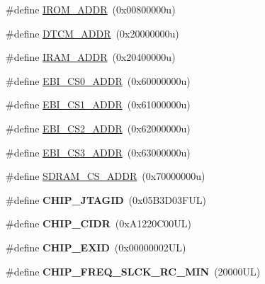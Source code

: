 \begin{DoxyCompactItemize}
\item 
\#define \mbox{\hyperlink{group__SAMV71Q20__definitions_ga694212ffb8c2786bacee3d0ad6020bda}{I\+R\+O\+M\+\_\+\+A\+D\+DR}}~(0x00800000u)
\item 
\#define \mbox{\hyperlink{group__SAMV71Q20__definitions_ga26626a425f7ebb3a0c2dbc276f0d9f78}{D\+T\+C\+M\+\_\+\+A\+D\+DR}}~(0x20000000u)
\item 
\#define \mbox{\hyperlink{group__SAMV71Q20__definitions_gaae45ac2ef16942159481c767ac4805cf}{I\+R\+A\+M\+\_\+\+A\+D\+DR}}~(0x20400000u)
\item 
\#define \mbox{\hyperlink{group__SAMV71Q20__definitions_ga9bcbb97ddae3b2cc5e2c9613d33f66b4}{E\+B\+I\+\_\+\+C\+S0\+\_\+\+A\+D\+DR}}~(0x60000000u)
\item 
\#define \mbox{\hyperlink{group__SAMV71Q20__definitions_gaaddd9fdbbc77c9aced5308819f502a26}{E\+B\+I\+\_\+\+C\+S1\+\_\+\+A\+D\+DR}}~(0x61000000u)
\item 
\#define \mbox{\hyperlink{group__SAMV71Q20__definitions_ga058a35f9991487dc2dd12ada792d0730}{E\+B\+I\+\_\+\+C\+S2\+\_\+\+A\+D\+DR}}~(0x62000000u)
\item 
\#define \mbox{\hyperlink{group__SAMV71Q20__definitions_gad66ebdd0fc33ec3cf85dbaa14bbf05d9}{E\+B\+I\+\_\+\+C\+S3\+\_\+\+A\+D\+DR}}~(0x63000000u)
\item 
\#define \mbox{\hyperlink{group__SAMV71Q20__definitions_ga61b7db25daf759c2a2beb6e5a0b57a84}{S\+D\+R\+A\+M\+\_\+\+C\+S\+\_\+\+A\+D\+DR}}~(0x70000000u)
\item 
\mbox{\label{group__SAMV71Q20__definitions_gaa614519778eec0df55d3eeab3223e3f6}} 
\#define {\bfseries C\+H\+I\+P\+\_\+\+J\+T\+A\+G\+ID}~(0x05\+B3\+D03\+F\+U\+L)
\item 
\mbox{\label{group__SAMV71Q20__definitions_ga1e1ae44dd9269a8a98c1d7e7a60e9fbd}} 
\#define {\bfseries C\+H\+I\+P\+\_\+\+C\+I\+DR}~(0x\+A1220\+C00\+U\+L)
\item 
\mbox{\label{group__SAMV71Q20__definitions_ga35123717aa86b76bb6b73cf3adc4c2e6}} 
\#define {\bfseries C\+H\+I\+P\+\_\+\+E\+X\+ID}~(0x00000002\+U\+L)
\item 
\mbox{\label{group__SAMV71Q20__definitions_ga0e868bf27426399dfdcb3a9dfc3733c4}} 
\#define {\bfseries C\+H\+I\+P\+\_\+\+F\+R\+E\+Q\+\_\+\+S\+L\+C\+K\+\_\+\+R\+C\+\_\+\+M\+IN}~(20000\+U\+L)

\end{DoxyCompactItemize}

